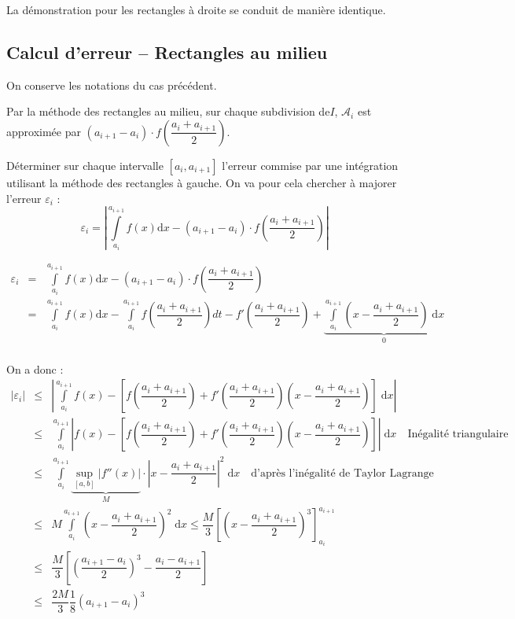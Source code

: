 \documentclass[10pt]{article}
\begin{document}
\begin{rem}
La démonstration pour les rectangles à droite se conduit de manière identique. 
\end{rem}

\subsection{Calcul d'erreur -- Rectangles au milieu}
On conserve les notations du cas précédent.

 Par la méthode des rectangles au milieu, sur chaque subdivision de$I$, $\mathcal{A}_i$ est approximée par $\left(a_{i+1}-a_{i}\right) \cdot f\left(\dfrac{a_i+a_{i+1}}{2}\right) $. 

\begin{Objectif}
Déterminer sur chaque intervalle $[a_i,a_{i+1}]$ l'erreur commise par une intégration utilisant la méthode des rectangles à gauche. On va pour cela chercher à majorer l'erreur $\varepsilon_i$ :
$$
\varepsilon_i = \left| \int\limits_{a_i}^{a_{i+1}}f(x)\mathrm{d}x -
\left(a_{i+1}-a_{i}\right) \cdot f\left(\dfrac{a_i+a_{i+1}}{2}\right)\right|
$$
\end{Objectif}

\begin{eqnarray*}
\varepsilon_i & = & \int\limits_{a_i}^{a_{i+1}}f(x)\mathrm{d}x -
\left(a_{i+1}-a_{i}\right) \cdot f\left(\dfrac{a_i+a_{i+1}}{2}\right) \\
 & = &  \int\limits_{a_i}^{a_{i+1}}f(x)\mathrm{d}x 
 - \int\limits_{a_i}^{a_{i+1}}f\left(\dfrac{a_i+a_{i+1}}{2}\right)dt 
 - f'\left(\dfrac{a_i+a_{i+1}}{2}\right) 
 + \underbrace{\int\limits_{a_i}^{a_{i+1}} \left( x - \dfrac{a_i+a_{i+1}}{2}\right)\;\mathrm{d}x}_{0} \\%
\end{eqnarray*}

  On a donc :  
\begin{eqnarray*}
|\varepsilon_i| & \leq &\left|
\int\limits_{a_i}^{a_{i+1}} f(x) - \left[
f\left(\dfrac{a_i+a_{i+1}}{2} \right)
+f'\left(\dfrac{a_i+a_{i+1}}{2} \right)\left(x - \dfrac{a_i+a_{i+1}}{2}\right)
\right] \; \mathrm{d}x\right| \\
& \leq & \int\limits_{a_i}^{a_{i+1}} \left|f(x) - \left[
f\left(\dfrac{a_i+a_{i+1}}{2} \right)
+f'\left(\dfrac{a_i+a_{i+1}}{2} \right)\left(x - \dfrac{a_i+a_{i+1}}{2}\right)
\right] \right|\; \mathrm{d}x \quad \text{Inégalité triangulaire}\\
& \leq & \int\limits_{a_i}^{a_{i+1}} \underbrace{\underset{[a,b]}{\sup} \left| f''(x)\right|}_{M} \cdot \left| x- \dfrac{a_i+a_{i+1}}{2}\right|^2  \; \mathrm{d}x \quad \text{d'après l'inégalité de Taylor Lagrange}\\
& \leq & M \int\limits_{a_i}^{a_{i+1}} \left( x- \dfrac{a_i+a_{i+1}}{2}\right)^2  \; \mathrm{d}x \leq \dfrac{M}{3} \left[ \left( x- \dfrac{a_i+a_{i+1}}{2}\right)^3\right]_{a_i}^{a_{i+1}} \\
& \leq & \dfrac{M}{3} \left[ \left( \dfrac{a_{i+1}-a_{i}}{2} \right)^3- \dfrac{a_i-a_{i+1}}{2}\right]\\
& \leq & \dfrac{2M}{3}\dfrac{1}{8}\left( {a_{i+1}-a_{i}}\right)^3
\end{eqnarray*}
\end{document}
